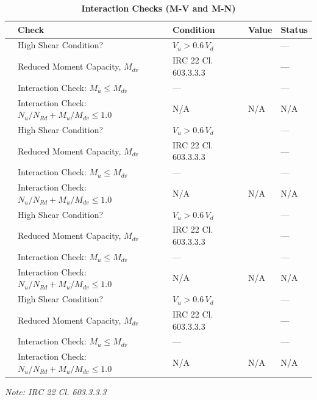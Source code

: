 \documentclass[12pt,a4paper]{report}
\numberwithin{table}{chapter}
\numberwithin{figure}{chapter}
\begin{document}
\vspace{1em}
\begin{longtable}{|C{2.5cm}|C{3.5cm}|C{3.5cm}|>{\centering\arraybackslash}p{4.2cm}|C{1.8cm}|}
\caption{\textbf{Interaction Checks (M-V and M-N)}}\\
\hline
\textbf{} & \textbf{Check} & \textbf{Condition} & \textbf{Value} & \textbf{Status} \\[6pt]
\hline
{} & High Shear Condition? & $V_u > 0.6\,V_d$ &  & --- \\[6pt]
 & Reduced Moment Capacity, $M_{dv}$ & IRC 22 Cl. 603.3.3.3 &  & --- \\[6pt]
 & Interaction Check: $M_u \leq M_{dv}$ & --- &  & --- \\[6pt]
 & Interaction Check: $N_u/N_{Rd} + M_u/M_{dv} \leq 1.0$ & N/A & N/A & N/A \\[6pt]
\hline
{} & High Shear Condition? & $V_u > 0.6\,V_d$ &  & --- \\[6pt]
 & Reduced Moment Capacity, $M_{dv}$ & IRC 22 Cl. 603.3.3.3 &  & --- \\[6pt]
 & Interaction Check: $M_u \leq M_{dv}$ & --- &  & --- \\[6pt]
 & Interaction Check: $N_u/N_{Rd} + M_u/M_{dv} \leq 1.0$ & N/A & N/A & N/A \\[6pt]
\hline
{} & High Shear Condition? & $V_u > 0.6\,V_d$ &  & --- \\[6pt]
 & Reduced Moment Capacity, $M_{dv}$ & IRC 22 Cl. 603.3.3.3 &  & --- \\[6pt]
 & Interaction Check: $M_u \leq M_{dv}$ & --- &  & --- \\[6pt]
 & Interaction Check: $N_u/N_{Rd} + M_u/M_{dv} \leq 1.0$ & N/A & N/A & N/A \\[6pt]
\hline
{} & High Shear Condition? & $V_u > 0.6\,V_d$ &  & --- \\[6pt]
 & Reduced Moment Capacity, $M_{dv}$ & IRC 22 Cl. 603.3.3.3 &  & --- \\[6pt]
 & Interaction Check: $M_u \leq M_{dv}$ & --- &  & --- \\[6pt]
 & Interaction Check: $N_u/N_{Rd} + M_u/M_{dv} \leq 1.0$ & N/A & N/A & N/A \\[6pt]
\hline
\end{longtable}
\noindent\textit{Note: IRC 22 Cl. 603.3.3.3}
\end{document}
